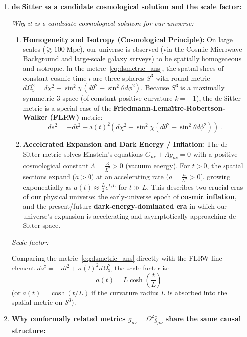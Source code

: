 \documentclass[12pt]{article}
\newcommand{\be}{\begin{equation}}
\newcommand{\ee}{\end{equation}}
\begin{document}
\begin{enumerate}[label=\alph*)]
\item \textbf{de Sitter as a candidate cosmological solution and the scale factor:}

\emph{Why it is a candidate cosmological solution for our universe:}
\begin{enumerate}[label=\roman*.]
\item \textbf{Homogeneity and Isotropy (Cosmological Principle):} On large scales ($\gtrsim 100\text{ Mpc}$), our universe is observed (via the Cosmic Microwave Background and large-scale galaxy surveys) to be spatially homogeneous and isotropic. In the metric~\eqref{eq:dsmetric_ans}, the spatial slices of constant cosmic time $t$ are three-spheres $S^3$ with round metric $d\Omega_3^2 = d\chi^2 + \sin^2\chi(d\theta^2 + \sin^2\theta d\phi^2)$. Because $S^3$ is a maximally symmetric 3-space (of constant positive curvature $k = +1$), the de Sitter metric is a special case of the \textbf{Friedmann-Lema\^{\i}tre-Robertson-Walker (FLRW)} metric:
\be
ds^2 = -dt^2 + a(t)^2 \left( d\chi^2 + \sin^2\chi \left( d\theta^2 + \sin^2\theta d\phi^2 \right) \right) \,.
\ee
\item \textbf{Accelerated Expansion and Dark Energy / Inflation:} The de Sitter metric solves Einstein's equations $G_{\mu\nu} + \Lambda g_{\mu\nu} = 0$ with a positive cosmological constant $\Lambda = \frac{3}{L^2} > 0$ (vacuum energy). For $t > 0$, the spatial sections expand ($\dot{a} > 0$) at an accelerating rate ($\ddot{a} = \frac{a}{L^2} > 0$), growing exponentially as $a(t) \approx \frac{L}{2} e^{t/L}$ for $t \gg L$. This describes two crucial eras of our physical universe: the early-universe epoch of \textbf{cosmic inflation}, and the present/future \textbf{dark-energy-dominated era} in which our universe's expansion is accelerating and asymptotically approaching de Sitter space.
\end{enumerate}

\emph{Scale factor:}

Comparing the metric~\eqref{eq:dsmetric_ans} directly with the FLRW line element $ds^2 = -dt^2 + a(t)^2 d\Omega_3^2$, the scale factor is:
\be
\boxed{a(t) = L \cosh\left(\frac{t}{L}\right)}
\ee
(or $a(t) = \cosh(t/L)$ if the curvature radius $L$ is absorbed into the spatial metric on $S^3$).

\item \textbf{Why conformally related metrics $g_{\mu\nu} = \Omega^2 \bar{g}_{\mu\nu}$ share the same causal structure:}


\end{enumerate}
\end{document}
